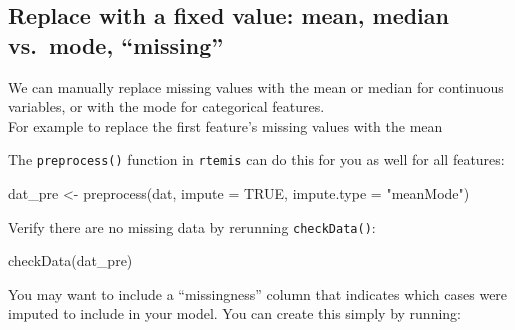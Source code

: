\documentclass[
]{book}
\newenvironment{Shaded}{\begin{snugshade}}{\end{snugshade}}
\newcommand{\AttributeTok}[1]{\textcolor[rgb]{0.77,0.63,0.00}{#1}}
\newcommand{\ConstantTok}[1]{\textcolor[rgb]{0.00,0.00,0.00}{#1}}
\newcommand{\FunctionTok}[1]{\textcolor[rgb]{0.00,0.00,0.00}{#1}}
\newcommand{\NormalTok}[1]{#1}
\newcommand{\OtherTok}[1]{\textcolor[rgb]{0.56,0.35,0.01}{#1}}
\newcommand{\SpecialCharTok}[1]{\textcolor[rgb]{0.00,0.00,0.00}{#1}}
\newcommand{\StringTok}[1]{\textcolor[rgb]{0.31,0.60,0.02}{#1}}
\begin{document}
\hypertarget{replace-with-a-fixed-value-mean-median-vs.-mode-missing}{%
\subsection{Replace with a fixed value: mean, median vs.~mode, ``missing''}\label{replace-with-a-fixed-value-mean-median-vs.-mode-missing}}

We can manually replace missing values with the mean or median for continuous variables, or with the mode for categorical features.\\
For example to replace the first feature's missing values with the mean

\begin{Shaded}
\end{Shaded}

The \texttt{preprocess()} function in \texttt{rtemis} can do this for you as well for all features:

\begin{Shaded}
\begin{Highlighting}[]
\NormalTok{dat\_pre }\OtherTok{\textless{}{-}} \FunctionTok{preprocess}\NormalTok{(dat, }\AttributeTok{impute =} \ConstantTok{TRUE}\NormalTok{, }\AttributeTok{impute.type =} \StringTok{"meanMode"}\NormalTok{)}
\end{Highlighting}
\end{Shaded}

Verify there are no missing data by rerunning \texttt{checkData()}:

\begin{Shaded}
\begin{Highlighting}[]
\FunctionTok{checkData}\NormalTok{(dat\_pre)}
\end{Highlighting}
\end{Shaded}

You may want to include a ``missingness'' column that indicates which cases were imputed to include in your model. You can create this simply by running:
\end{document}
